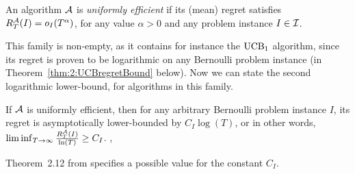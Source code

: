 \begin{definition}\label{def:2:uniformlyEfficientAlgorithm}
\begin{leftbar}[defnbar]  %
    An algorithm $\mathcal{A}$ is \emph{uniformly efficient} if its (mean) regret satisfies
    $R_T^{\mathcal{A}}(I) = o_I(T^{\alpha})$,
    for any value $\alpha>0$ and any problem instance $I\in \mathcal{I}$.
\end{leftbar}  %
\end{definition}

This family is non-empty, as it contains for instance the $\mathrm{UCB}_1$ algorithm, since its regret is proven to be logarithmic on any Bernoulli problem instance (in Theorem~\ref{thm:2:UCBregretBound} below).
Now we can state the second logarithmic lower-bound, for algorithms in this family.

\begin{theorem}\label{thm:2:secondLogTLowerBound}
\begin{leftbar}[theorembar]  %
    If $\mathcal{A}$ is uniformly efficient,
    then for any arbitrary Bernoulli problem instance $I$,
    its regret is asymptotically lower-bounded by $C_I \log(T)$,
    or in other words,
    $\liminf_{T\to\infty} \frac{R_T^{\mathcal{A}}(I)}{\ln(T)} \geq C_I$.
    \hfill{} \cite[Theorem~2.13]{Slivkins2019},
\end{leftbar}  %
\end{theorem}

Theorem~2.12 from \cite{Slivkins2019} specifies a possible value for the constant $C_I$.

